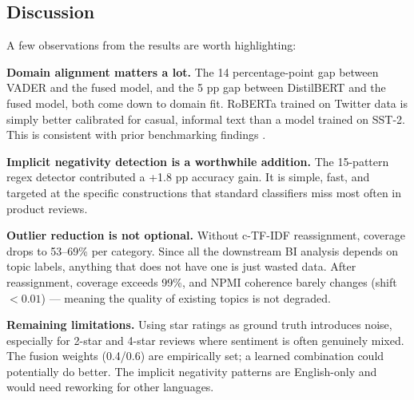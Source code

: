 \subsection{Discussion}
\begin{justify}
A few observations from the results are worth highlighting:

\textbf{Domain alignment matters a lot.} The 14 percentage-point gap between VADER and the fused model, and the 5 pp gap between DistilBERT and the fused model, both come down to domain fit. RoBERTa trained on Twitter data is simply better calibrated for casual, informal text than a model trained on SST-2. This is consistent with prior benchmarking findings \cite{yin2020benchmarking}.

\textbf{Implicit negativity detection is a worthwhile addition.} The 15-pattern regex detector contributed a +1.8 pp accuracy gain. It is simple, fast, and targeted at the specific constructions that standard classifiers miss most often in product reviews.

\textbf{Outlier reduction is not optional.} Without c-TF-IDF reassignment, coverage drops to 53--69\% per category. Since all the downstream BI analysis depends on topic labels, anything that does not have one is just wasted data. After reassignment, coverage exceeds 99\%, and NPMI coherence barely changes (shift $< 0.01$) — meaning the quality of existing topics is not degraded.

\textbf{Remaining limitations.} Using star ratings as ground truth introduces noise, especially for 2-star and 4-star reviews where sentiment is often genuinely mixed. The fusion weights (0.4/0.6) are empirically set; a learned combination could potentially do better. The implicit negativity patterns are English-only and would need reworking for other languages.
\end{justify}
